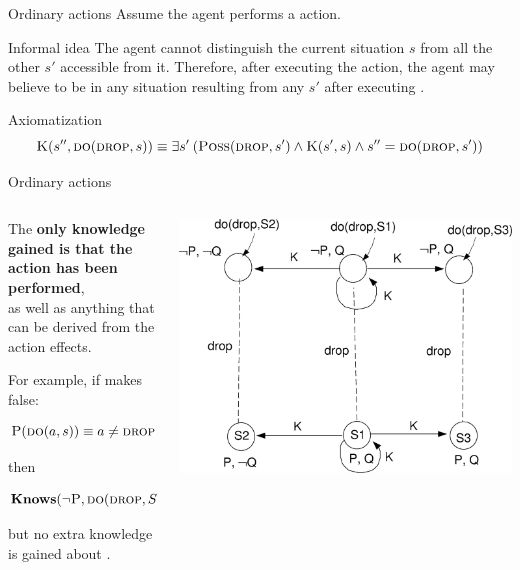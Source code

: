 \begin{frame}{Ordinary actions}
    Assume the agent performs a  action.

    \begin{block}{Informal idea}
        The agent cannot distinguish the current situation \(s\) from all the other
        \(s'\) accessible from it. Therefore, after executing the action,
        the agent may believe to be in any situation resulting from any \(s'\) after executing \scdrop.
    \end{block}

    \begin{block}{Axiomatization}
        \[ \textsc{K}(s'', \textsc{do}(\textsc{drop}, s)) \equiv \exists s' \: (\textsc{Poss}(\textsc{drop}, s') \land \textsc{K}(s',s) \land s'' = \textsc{do}(\textsc{drop}, s')) \]
    \end{block}
\end{frame}

\begin{frame}{Ordinary actions}
    \begin{columns}
        \begin{column}{0.5\textwidth}
            The \textbf{only knowledge gained is that the} \scdrop{} \textbf{action has been performed},\\
            as well as anything that can be derived from the action effects.
            
            For example, if \scdrop{} makes \scp{} false:

            \[ \textsc{P}(\textsc{do}(a,s)) \equiv a \not = \textsc{drop} \land \textsc{P}(s) \]

            then

            \[ \textbf{Knows}(\lnot \textsc{P}, \textsc{do}(\textsc{drop}, S1)) \]

            but no extra knowledge is gained about \scq.
        \end{column}

        \begin{column}{0.5\textwidth}
            \includegraphics[width=\textwidth]{assets/3states_dropaction}
        \end{column}
    \end{columns}
\end{frame}

